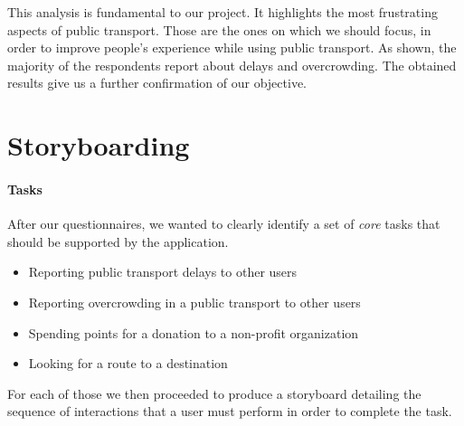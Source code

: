 \documentclass[a4paper, 11pt]{report}
\newenvironment{titlebox}[1][]{%
  \centering
  \basecolorbox[#1]%
}{%
  \endbasecolorbox%
}
\begin{document}
This analysis is fundamental to our project. It highlights the most frustrating aspects of public transport.
Those are the ones on which we should focus, in order to improve people's experience while using public transport.
As shown, the majority of the respondents report about delays and overcrowding. The obtained results give us a further confirmation of our objective.


%
%
\section{Storyboarding}\label{sec:storyboarding}

\paragraph{Tasks}

After our questionnaires, we wanted to clearly identify a set of \emph{core} tasks that should be
supported by the application.

\begin{titlebox}[The Tasks:]
	\begin{itemize}\label{list:tasks}
		\item Reporting public transport delays to other users
		\item Reporting overcrowding in a public transport to other users
		\item Spending points for a donation to a non-profit organization
		\item Looking for a route to a destination
	\end{itemize}
\end{titlebox}


For each of those we then proceeded to produce a storyboard detailing the sequence of
interactions that a user must perform in order to complete the task.
\end{document}
